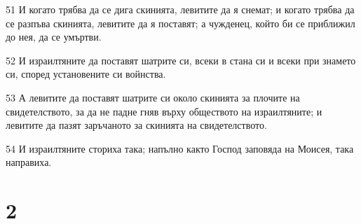 \par 51 И когато трябва да се дига скинията, левитите да я снемат; и когато трябва да се разпъва скинията, левитите да я поставят; а чужденец, който би се приближил до нея, да се умъртви.
\par 52 И израилтяните да поставят шатрите си, всеки в стана си и всеки при знамето си, според установените си войнства.
\par 53 А левитите да поставят шатрите си около скинията за плочите на свидетелството, за да не падне гняв върху обществото на израилтяните; и левитите да пазят заръчаното за скинията на свидетелството.
\par 54 И израилтяните сториха така; напълно както Господ заповяда на Моисея, така направиха.

\chapter{2}

